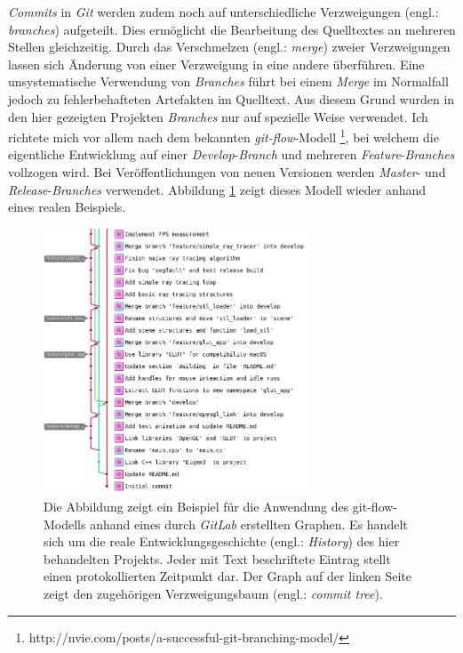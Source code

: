 \documentclass[crop=false]{standalone}
\begin{document}
    \textit{Commits} in \textit{Git} werden zudem noch auf unterschiedliche Verzweigungen (engl.: \textit{branches}) aufgeteilt.
    Dies ermöglicht die Bearbeitung des Quelltextes an mehreren Stellen gleichzeitig.
    Durch das Verschmelzen (engl.: \textit{merge}) zweier Verzweigungen lassen sich Änderung von einer Verzweigung in eine andere überführen.
    Eine unsystematische Verwendung von \textit{Branches} führt bei einem \textit{Merge} im Normalfall jedoch zu fehlerbehafteten Artefakten im Quelltext.
    Aus diesem Grund wurden in den hier gezeigten Projekten \textit{Branches} nur auf spezielle Weise verwendet.
    Ich richtete mich vor allem nach dem bekannten \textit{git-flow}-Modell%
    \footnote{http://nvie.com/posts/a-successful-git-branching-model/}, %
    bei welchem die eigentliche Entwicklung auf einer \textit{Develop}-\textit{Branch} und mehreren \textit{Feature}-\textit{Branches} vollzogen wird.
    Bei Veröffentlichungen von neuen Versionen werden \textit{Master}- und \textit{Release}-\textit{Branches} verwendet.
    Abbildung \ref{fig:git-flow-example} zeigt dieses Modell wieder anhand eines realen Beispiels.
    \begin{figure}
      \center
      \includegraphics[width=0.7\textwidth]{images/git_flow_example.png}
      \caption{%
        Die Abbildung zeigt ein Beispiel für die Anwendung des git-flow-Modells anhand eines durch \textit{GitLab} erstellten Graphen.
        Es handelt sich um die reale Entwicklungsgeschichte (engl.: \textit{History}) des hier behandelten Projekts.
        Jeder mit Text beschriftete Eintrag stellt einen protokollierten Zeitpunkt dar.
        Der Graph auf der linken Seite zeigt den zugehörigen Verzweigungsbaum (engl.: \textit{commit tree}).
      }
      \label{fig:git-flow-example}
    \end{figure}
\end{document}
